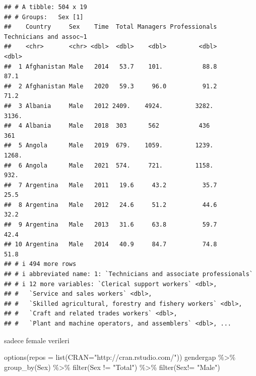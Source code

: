 \documentclass[
]{article}
\newenvironment{Shaded}{\begin{snugshade}}{\end{snugshade}}
\newcommand{\AttributeTok}[1]{\textcolor[rgb]{0.77,0.63,0.00}{#1}}
\newcommand{\FunctionTok}[1]{\textcolor[rgb]{0.00,0.00,0.00}{#1}}
\newcommand{\NormalTok}[1]{#1}
\newcommand{\SpecialCharTok}[1]{\textcolor[rgb]{0.00,0.00,0.00}{#1}}
\newcommand{\StringTok}[1]{\textcolor[rgb]{0.31,0.60,0.02}{#1}}
\begin{document}
\begin{verbatim}
## # A tibble: 504 x 19
## # Groups:   Sex [1]
##    Country     Sex    Time  Total Managers Professionals Technicians and assoc~1
##    <chr>       <chr> <dbl>  <dbl>    <dbl>         <dbl>                   <dbl>
##  1 Afghanistan Male   2014   53.7    101.           88.8                    87.1
##  2 Afghanistan Male   2020   59.3     96.0          91.2                    71.2
##  3 Albania     Male   2012 2409.    4924.         3282.                   3136. 
##  4 Albania     Male   2018  303      562           436                     361  
##  5 Angola      Male   2019  679.    1059.         1239.                   1268. 
##  6 Angola      Male   2021  574.     721.         1158.                    932. 
##  7 Argentina   Male   2011   19.6     43.2          35.7                    25.5
##  8 Argentina   Male   2012   24.6     51.2          44.6                    32.2
##  9 Argentina   Male   2013   31.6     63.8          59.7                    42.4
## 10 Argentina   Male   2014   40.9     84.7          74.8                    51.8
## # i 494 more rows
## # i abbreviated name: 1: `Technicians and associate professionals`
## # i 12 more variables: `Clerical support workers` <dbl>,
## #   `Service and sales workers` <dbl>,
## #   `Skilled agricultural, forestry and fishery workers` <dbl>,
## #   `Craft and related trades workers` <dbl>,
## #   `Plant and machine operators, and assemblers` <dbl>, ...
\end{verbatim}

sadece female verileri

\begin{Shaded}
\begin{Highlighting}[]
\FunctionTok{options}\NormalTok{(}\AttributeTok{repos =} \FunctionTok{list}\NormalTok{(}\AttributeTok{CRAN=}\StringTok{"http://cran.rstudio.com/"}\NormalTok{))}
\NormalTok{gendergap }\SpecialCharTok{\%\textgreater{}\%}
\FunctionTok{group\_by}\NormalTok{(Sex) }\SpecialCharTok{\%\textgreater{}\%}
  \FunctionTok{filter}\NormalTok{(Sex }\SpecialCharTok{!=} \StringTok{"Total"}\NormalTok{) }\SpecialCharTok{\%\textgreater{}\%}
\FunctionTok{filter}\NormalTok{(Sex}\SpecialCharTok{!=} \StringTok{"Male"}\NormalTok{)}
\end{Highlighting}
\end{Shaded}
\end{document}
